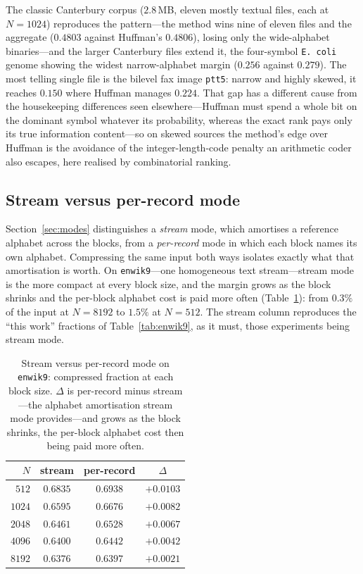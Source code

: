 \documentclass[entropy,article,submit,oneauthor,pdftex]{Definitions/mdpi}
\begin{document}
The classic Canterbury corpus ($2.8$\,MB, eleven mostly textual files, each at
$N{=}1024$) reproduces the pattern---the method wins nine of eleven files and the
aggregate ($0.4803$ against Huffman's $0.4806$), losing only the wide-alphabet
binaries---and the larger Canterbury files extend it, the four-symbol \texttt{E.\,coli}
genome showing the widest narrow-alphabet margin ($0.256$ against $0.279$). The most
telling single file is the bilevel fax image \texttt{ptt5}: narrow and highly skewed, it
reaches $0.150$ where Huffman manages $0.224$. That gap has a different cause from the
housekeeping differences seen elsewhere---Huffman must spend a whole bit on the dominant
symbol whatever its probability, whereas the exact rank pays only its true information
content---so on skewed sources the method's edge over Huffman is the avoidance of the
integer-length-code penalty an arithmetic coder also escapes, here realised by
combinatorial ranking.
\subsection{Stream versus per-record mode}\label{sec:modeexp}
Section~\ref{sec:modes} distinguishes a \emph{stream} mode, which amortises a
reference alphabet across the blocks, from a \emph{per-record} mode in which each
block names its own alphabet. Compressing the same input both ways isolates exactly
what that amortisation is worth. On \texttt{enwik9}---one homogeneous text
stream---stream mode is the more compact at every block size, and the margin grows
as the block shrinks and the per-block alphabet cost is paid more often
(Table~\ref{tab:modes}): from $0.3\%$ of the input at $N{=}8192$ to $1.5\%$ at
$N{=}512$. The stream column reproduces the ``this work'' fractions of
Table~\ref{tab:enwik9}, as it must, those experiments being stream mode.

\begin{table}[ht]
\centering
\caption{Stream versus per-record mode on \texttt{enwik9}: compressed fraction at
each block size. $\Delta$ is per-record minus stream---the alphabet amortisation
stream mode provides---and grows as the block shrinks, the per-block alphabet cost
then being paid more often.}
\begin{tabular}{r c c c}
\toprule
\textbf{$N$} & \textbf{stream} & \textbf{per-record} & $\Delta$ \\
\midrule
$512$  & $0.6835$ & $0.6938$ & $+0.0103$ \\
$1024$ & $0.6595$ & $0.6676$ & $+0.0082$ \\
$2048$ & $0.6461$ & $0.6528$ & $+0.0067$ \\
$4096$ & $0.6400$ & $0.6442$ & $+0.0042$ \\
$8192$ & $0.6376$ & $0.6397$ & $+0.0021$ \\
\bottomrule
\end{tabular}
\label{tab:modes}
\end{table}
\end{document}
